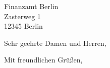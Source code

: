 \documentclass[12pt,ngerman]{scrlttr2}
\begin{document}
\begin{letter}{Finanzamt Berlin \\ Zasterweg 1 \\ 12345 Berlin}

\opening{Sehr geehrte Damen und Herren,}

\blindtext[3]

\closing{Mit freundlichen Grüßen,}

\end{letter}
\end{document}
